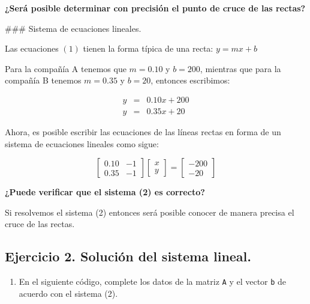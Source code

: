\documentclass[
  letterpaper,
  DIV=11,
  numbers=noendperiod]{scrreprt}
\providecommand{\tightlist}{%
  \setlength{\itemsep}{0pt}\setlength{\parskip}{0pt}}\usepackage{longtable,booktabs,array}
\begin{document}
\textbf{¿Será posible determinar con precisión el punto de cruce de las
rectas?}

\#\#\# Sistema de ecuaciones lineales.

Las ecuaciones \((1)\) tienen la forma típica de una recta:
\(y = m x + b\)

Para la compañía A tenemos que \(m = 0.10\) y \(b = 200\), mientras que
para la compañía B tenemos \(m = 0.35\) y \(b = 20\), entonces
escribimos:

\[
\begin{array}{ccc}
y & = & 0.10 x + 200 \\
y & = & 0.35 x + 20
\end{array}
\]

Ahora, es posible escribir las ecuaciones de las líneas rectas en forma
de un sistema de ecuaciones lineales como sigue:

\[
\left[
\begin{array}{cc}
0.10 & -1 \\
0.35 & -1
\end{array} \right]
\left[
\begin{array}{c}
x \\
y
\end{array} \right] =
\left[
\begin{array}{c}
-200 \\ 
-20
\end{array} \right] \tag{2}
\]

\textbf{¿Puede verificar que el sistema (2) es correcto?}

Si resolvemos el sistema (2) entonces será posible conocer de manera
precisa el cruce de las rectas.

\subsection{Ejercicio 2. Solución del sistema
lineal.}\label{ejercicio-2.-soluciuxf3n-del-sistema-lineal.}

\begin{enumerate}
\def\labelenumi{\arabic{enumi}.}
\tightlist
\item
  En el siguiente código, complete los datos de la matriz \texttt{A} y
  el vector \texttt{b} de acuerdo con el sistema (2).
\end{enumerate}
\end{document}
